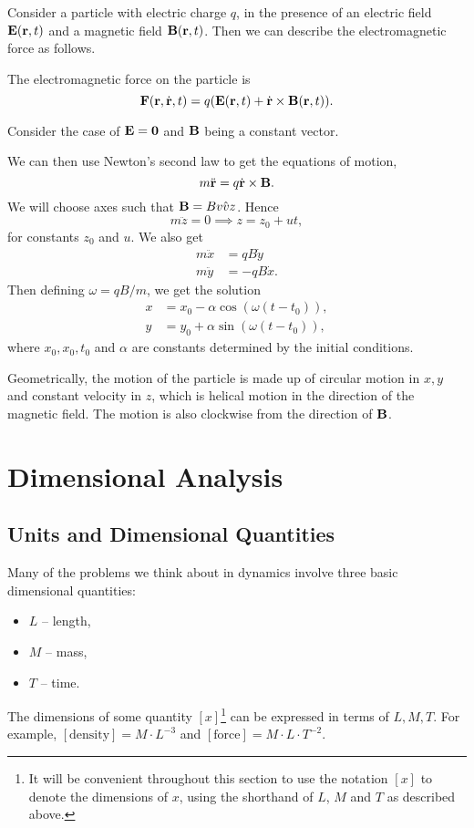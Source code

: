 \documentclass[a4paper]{scrartcl}
\newcommand{\newchapter}{\section}
\newcommand{\newsection}{\subsection}
\begin{document}
Consider a particle with electric charge $q$, in the presence of an electric field $\mathbf{E}(\mathbf{r}, t)$ and a magnetic field $\mathbf{B}(\mathbf{r}, t)$. Then we can describe the electromagnetic force as follows.

\begin{law*}
	The electromagnetic force on the particle is
	$$
	\mathbf{F}(\mathbf{r}, \dot{\mathbf{r}}, t) = q(\mathbf{E}(\mathbf{r}, t) + \dot{\mathbf{r}} \times \mathbf{B}(\mathbf{r}, t)).
	$$
\end{law*}

\begin{example}
	Consider the case of $\mathbf{E} = \mathbf{0}$ and $\mathbf{B}$ being a constant vector.

	We can then use Newton's second law to get the equations of motion,
	$$
	m \ddot{\mathbf{r}} = q \dot{\mathbf{r}} \times \mathbf{B}.
	$$
	We will choose axes such that $\mathbf{B} = B \hat{vv{z}}$. Hence
	$$
	m \ddot{z} = 0 \implies z = z_0 + ut,
	$$
	for constants $z_0$ and $u$. We also get
	\begin{align*}
		m \ddot{x} &= qB \dot{y}\\
	m \ddot{y} &= -qB \dot{x}.
	\end{align*}
	Then defining $\omega  = qB/m$, we get the solution
	\begin{align*}
		x &= x_0 - \alpha \cos (\omega(t - t_0)),\\
		y &= y_0 + \alpha \sin(\omega(t - t_0)),
	\end{align*}
	where $x_0, x_0, t_0$ and $\alpha$ are constants determined by the initial conditions.

	Geometrically, the motion of the particle is made up of circular motion in $x, y$ and constant velocity in $z$, which is helical motion in the direction of the magnetic field. The motion is also clockwise from the direction of $\mathbf{B}$.
\end{example}

\newchapter{Dimensional Analysis}

\newsection{Units and Dimensional Quantities}

Many of the problems we think about in dynamics involve three basic dimensional quantities: 
\begin{itemize}
	\item $L$ -- length,
	\item $M$ -- mass,
	\item $T$ -- time.
\end{itemize}
The dimensions of some quantity $[x]$\footnote{It will be convenient throughout this section to use the notation $[x]$ to denote the dimensions of $x$, using the shorthand of $L$, $M$ and $T$ as described above.} can be expressed in terms of $L, M, T$.
For example, $[\text{density}] = M \cdot L^{-3}$ and $[\text{force}] = M \cdot L \cdot T^{-2}$.
\end{document}
